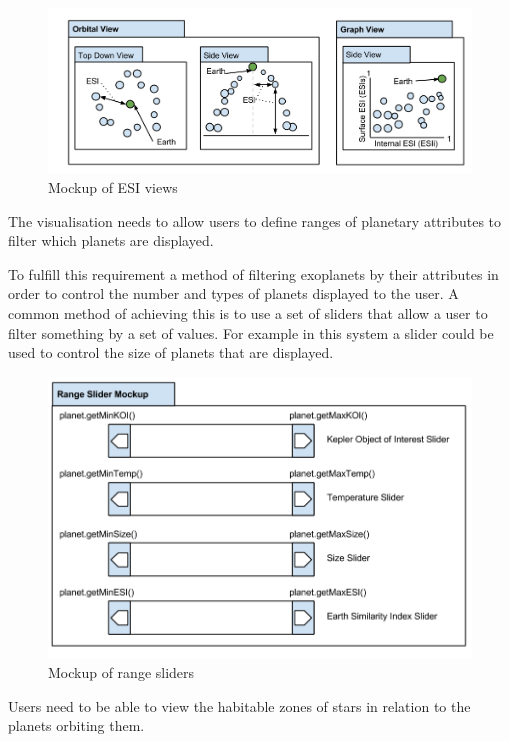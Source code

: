 \begin{enumerate}
\begin{figure}[H]
  \centering
      \includegraphics[width=1\textwidth]{images/mockupESI.png}
  \caption{Mockup of ESI views}  
\end{figure}


{\bf
 \item[R4.] The visualisation needs to allow users to define ranges of planetary
attributes to filter which planets are displayed.}

To fulfill this requirement a method of filtering exoplanets by their attributes
in order to control the number and types of planets displayed to the user. A
common method of achieving this is to use a set of sliders that allow a user to
filter something by a set of values. For example in this system a slider could
be used to control the size of planets that are displayed.

\begin{figure}[H]
  \centering
      \includegraphics[width=.8\textwidth]{images/mockSlider.png}
  \caption{Mockup of range sliders}  
\end{figure}



{\bf
 \item[R5.] Users need to be able to view the habitable zones of stars in relation to the planets orbiting them.}


\end{enumerate}
